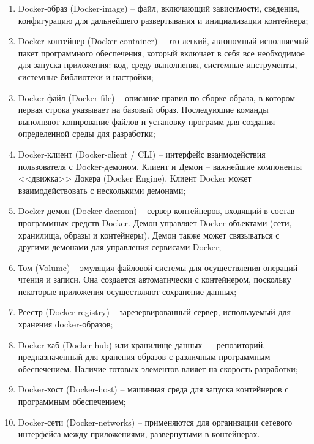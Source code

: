 \begin{enumerate}
	\item Docker-образ (Docker-image) -- файл, включающий зависимости, сведения, конфигурацию для дальнейшего развертывания и инициализации контейнера;
	\item Docker-контейнер (Docker-container) -- это легкий, автономный исполняемый пакет программного обеспечения, который включает в себя все необходимое для запуска приложения: код, среду выполнения, системные инструменты, системные библиотеки и настройки;
	\item Docker-файл (Docker-file) -- описание правил по сборке образа, в котором первая строка указывает на базовый образ. Последующие команды выполняют копирование файлов и установку программ для создания определенной среды для разработки;
	\item Docker-клиент (Docker-client / CLI) -- интерфейс взаимодействия пользователя с Docker-демоном. Клиент и Демон -- важнейшие компоненты <<движка>> Докера (Docker Engine). Клиент Docker может взаимодействовать с несколькими демонами;
	\item Docker-демон (Docker-daemon) -- сервер контейнеров, входящий в состав программных средств Docker. Демон управляет Docker-объектами (сети, хранилища, образы и контейнеры). Демон также может связываться с другими демонами для управления сервисами Docker;
	\item Том (Volume) -- эмуляция файловой системы для осуществления операций чтения и записи. Она создается автоматически с контейнером, поскольку некоторые приложения осуществляют сохранение данных;
	\item Реестр (Docker-registry) -- зарезервированный сервер, используемый для хранения docker-образов;
	\item Docker-хаб (Docker-hub) или хранилище данных — репозиторий, предназначенный для хранения образов с различным программным обеспечением. Наличие готовых элементов влияет на скорость разработки;
	\item Docker-хост (Docker-host) -- машинная среда для запуска контейнеров с программным обеспечением;
	\item Docker-сети (Docker-networks) -- применяются для организации сетевого интерфейса между приложениями, развернутыми в контейнерах.
\end{enumerate}
\noteattributes{}

